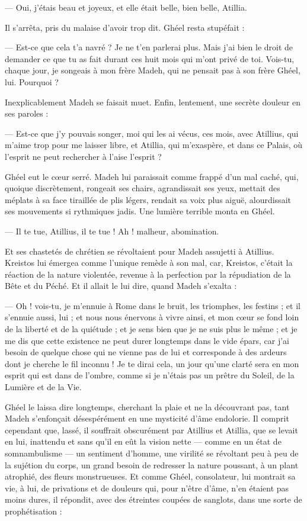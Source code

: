 \documentclass[a4paper, 11pt, oneside, polutonikogreek, french]{article}
\begin{document}
--- Oui, j'étais beau et joyeux, et elle était belle, bien belle, Atillia.

Il s'arrêta, pris du malaise d'avoir trop dit. Ghéel resta stupéfait :

--- Est-ce que cela t'a navré ? Je ne t'en parlerai plus. Mais j'ai bien le droit de demander ce que tu as fait durant ces huit mois qui m'ont privé de toi. Vois-tu, chaque jour, je songeais à mon frère Madeh, qui ne pensait pas à son frère Ghéel, lui. Pourquoi ?

Inexplicablement Madeh se faisait muet. Enfin, lentement, une secrète douleur en ses paroles :

--- Est-ce que j'y pouvais songer, moi qui les ai vécus, ces mois, avec Atillius, qui m'aime trop pour me laisser libre, et Atillia, qui m'exaspère, et dans ce Palais, où l'esprit ne peut rechercher à l'aise l'esprit ?

Ghéel eut le cœur serré. Madeh lui paraissait comme frappé d'un mal caché, qui, quoique discrètement, rongeait ses chairs, agrandissait ses yeux, mettait des méplats à sa face tiraillée de plis légers, rendait sa voix plus aiguë, alourdissait ses mouvements si rythmiques jadis. Une lumière terrible monta en Ghéel.

--- Il te tue, Atillius, il te tue ! Ah ! malheur, abomination.

Et ses chastetés de chrétien se révoltaient pour Madeh assujetti à Atillius. Kreistos lui émergea comme l'unique remède à son mal, car, Kreistos, c'était la réaction de la nature violentée, revenue à la perfection par la répudiation de la Bête et du Péché. Et il allait le lui dire, quand Madeh s'exalta :

--- Oh ! vois-tu, je m'ennuie à Rome dans le bruit, les triomphes, les festins ; et il s'ennuie aussi, lui ; et nous nous énervons à vivre ainsi, et mon cœur se fond loin de la liberté et de la quiétude ; et je sens bien que je ne suis plus le même ; et je me dis que cette existence ne peut durer longtemps dans le vide épars, car j'ai besoin de quelque chose qui ne vienne pas de lui et corresponde à des ardeurs dont je cherche le fil inconnu ! Je te dirai cela, un jour qu'une clarté sera en mon esprit qui est dans de l'ombre, comme si je n'étais pas un prêtre du Soleil, de la Lumière et de la Vie.

Ghéel le laissa dire longtemps, cherchant la plaie et ne la découvrant pas, tant Madeh s'enfonçait désespérément en une mysticité d'âme endolorie. Il comprit cependant que, lassé, il souffrait obscurément par Atillius et Atillia, que se levait en lui, inattendu et sans qu'il en eût la vision nette --- comme en un état de somnambulisme --- un sentiment d'homme, une virilité se révoltant peu à peu de la sujétion du corps, un grand besoin de redresser la nature poussant, à un plant atrophié, des fleurs monstrueuses. Et comme Ghéel, consolateur, lui montrait sa vie, à lui, de privations et de douleurs qui, pour n'être d'âme, n'en étaient pas moins dures, il répondit, avec des étreintes coupées de sanglots, dans une sorte de prophétisation :
\end{document}
